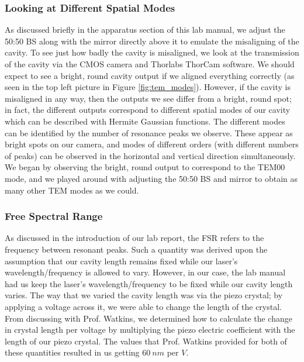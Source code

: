 \documentclass[twocolumn,amsmath,amssymb,pra]{revtex4-2}
\begin{document}
\subsubsection{Looking at Different Spatial Modes}
As discussed briefly in the apparatus section of this lab manual, we adjust the 50:50 BS along with the mirror directly above it to emulate the misaligning of the cavity. To see just how badly the cavity is misaligned, we look at the transmission of the cavity via the CMOS camera and Thorlabs ThorCam software. We should expect to see a bright, round cavity output if we aligned everything correctly (as seen in the top left picture in Figure \ref{fig:tem_modes}). However, if the cavity is misaligned in any way, then the outputs we see differ from a bright, round spot; in fact, the different outputs correspond to different spatial modes of our cavity which can be described with Hermite Gaussian functions. The different modes can be identified by the number of resonance peaks we observe. These appear as bright spots on our camera, and modes of different orders (with different numbers of peaks) can be observed in the horizontal and vertical direction simultaneously. We began by observing the bright, round output to correspond to the TEM00 mode, and we played around with adjusting the 50:50 BS and mirror to obtain as many other TEM modes as we could.

\subsubsection{Free Spectral Range}
As discussed in the introduction of our lab report, the FSR refers to the frequency between resonant peaks. Such a quantity was derived upon the assumption that our cavity length remains fixed while our laser's wavelength/frequency is allowed to vary. However, in our case, the lab manual had us keep the laser's wavelength/frequency to be fixed while our cavity length varies. The way that we varied the cavity length was via the piezo crystal; by applying a voltage across it, we were able to change the length of the crystal. From discussing with Prof. Watkins, we determined how to calculate the change in crystal length per voltage by multiplying the piezo electric coefficient with the length of our piezo crystal. The values that Prof. Watkins provided for both of these quantities resulted in us getting $60 \ \si{nm}$ per $V$. 
\end{document}

